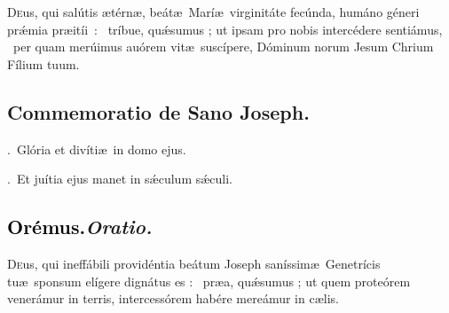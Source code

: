 \documentclass[12pt]{article} %
\newenvironment{response}{\leftskip 0in \setlength{\parindent}{0in}}{\vspace{2 mm}}
\let\oldgresixstar\gresixstar
\renewcommand{\gresixstar}{\textcolor{benred8}{\oldgresixstar}}
\let\oldgredagger\gredagger
\renewcommand{\gredagger}{\textcolor{benred8}{\oldgredagger}}
\let\oldVbar\Vbar
\renewcommand{\Vbar}{\textcolor{benred8}{\oldVbar .}}
\let\oldRbar\Rbar
\renewcommand{\Rbar}{\textcolor{benred8}{\oldRbar .}}
\def\capitulumSpace{\hspace{20 mm}}
\begin{document}
\begin{response}\lettrine{D}{e}us, qui sal\'{u}tis \ae t\'{e}rn\ae , be\'{a}t\ae\ Mar\'{i}\ae\ virginit\'{a}te fec\'{u}nda, hum\'{a}no g\'{e}neri pr\'{\ae}mia \mbox{pr\ae{}it\'{i}i : \gredagger} tr\'{i}bue, qu\'{\ae}sumus ; ut ipsam pro nobis interc\'{e}dere senti\'{a}mus, \gresixstar\ per quam mer\'{u}imus au\'{o}rem vit\ae\ susc\'{i}pere, D\'{o}minum norum Jesum Chrium F\'{i}lium tuum.

\end{response}


\subsection*{Commemoratio de Sano Joseph.}


\gresetfirstlineaboveinitial{\small \textsc{ \textbf{\textcolor{benred8}{VIII}}}}{\small \textsc{ \textbf{\textcolor{benred8}{VIII}}}}

\begin{response}
\Vbar\ Gl\'{o}ria et div\'{i}ti\ae\ in domo ejus.

\Rbar\ Et ju\'{i}tia ejus manet in s\'{\ae}culum s\'{\ae}culi.

\end{response}

\subsection*{\textcolor{black}{Or\'{e}mus.}\capitulumSpace \emph{Oratio.}}

\begin{response}\lettrine{D}{e}us, qui ineff\'{a}bili provid\'{e}ntia be\'{a}tum Joseph san\'{i}ssim\ae\ Genetr\'{i}cis tu\ae\ sponsum el\'{i}gere dign\'{a}tus es : \gresixstar\ pr\ae {}a, qu\'{\ae}sumus ; ut quem prote\'{o}rem vener\'{a}mur in terris, intercess\'{o}rem hab\'{e}re mere\'{a}mur in c\ae lis.

\end{response}

\end{document}
